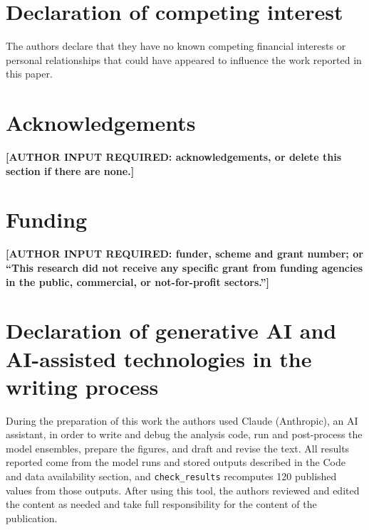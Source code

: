 \documentclass[preprint,12pt,authoryear]{elsarticle}
\begin{document}
\section*{Declaration of competing interest}
The authors declare that they have no known competing financial interests or personal relationships that could have appeared to influence the work reported in this paper.

\section*{Acknowledgements}
\textbf{[AUTHOR INPUT REQUIRED: acknowledgements, or delete this section if there are none.]}

\section*{Funding}
\textbf{[AUTHOR INPUT REQUIRED: funder, scheme and grant number; or ``This research did not receive any specific grant from funding agencies in the public, commercial, or not-for-profit sectors.'']}

\section*{Declaration of generative AI and AI-assisted technologies in the writing process}
During the preparation of this work the authors used Claude (Anthropic), an AI assistant, in order to write and debug the analysis code, run and post-process the model ensembles, prepare the figures, and draft and revise the text. All results reported come from the model runs and stored outputs described in the Code and data availability section, and \texttt{check\_results} recomputes 120 published values from those outputs. After using this tool, the authors reviewed and edited the content as needed and take full responsibility for the content of the publication.
\end{document}
